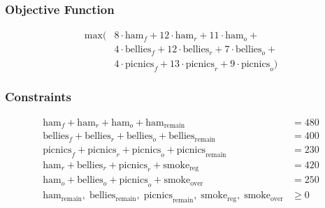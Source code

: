 \documentclass[letterpaper,10pt]{article}
\begin{document}
		\subsubsection{Objective Function}
			\begin{align*}
				\text{max} ( & 8\cdot\text{ham}_f + 12\cdot\text{ham}_r + 11\cdot\text{ham}_o + \\
							 & 4\cdot\text{bellies}_f + 12\cdot\text{bellies}_r + 7\cdot\text{bellies}_o + \\
							 & 4\cdot\text{picnics}_f + 13\cdot\text{picnics}_r + 9\cdot\text{picnics}_o )
			\end{align*}

		\subsubsection{Constraints} 

			\begin{align*}
				\text{ham}_f + \text{ham}_r + \text{ham}_o + \text{ham}_\text{remain}                 &= 480 \\
				\text{bellies}_f + \text{bellies}_r + \text{bellies}_o + \text{bellies}_\text{remain} &= 400 \\
				\text{picnics}_f + \text{picnics}_r + \text{picnics}_o + \text{picnics}_\text{remain} &= 230 \\
				\text{ham}_r + \text{bellies}_r + \text{picnics}_r + \text{smoke}_\text{reg}   &= 420 \\
				\text{ham}_o + \text{bellies}_o + \text{picnics}_o + \text{smoke}_\text{over}  &= 250 \\
				\text{ham}_\text{remain}, \; \text{bellies}_\text{remain}, \; \text{picnics}_\text{remain}, \; \text{smoke}_\text{reg}, \; \text{smoke}_\text{over} &\ge 0
			\end{align*}
\end{document}
